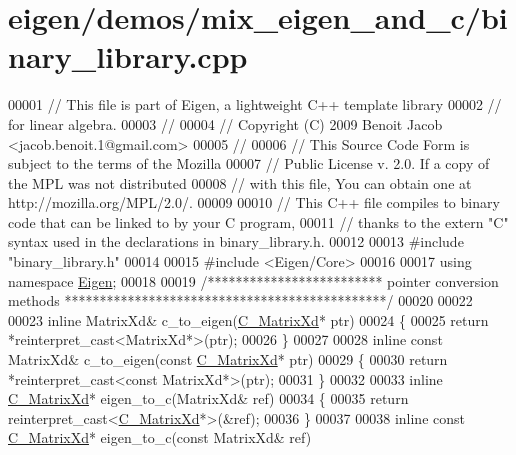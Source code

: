 \hypertarget{eigen_2demos_2mix__eigen__and__c_2binary__library_8cpp_source}{}\section{eigen/demos/mix\+\_\+eigen\+\_\+and\+\_\+c/binary\+\_\+library.cpp}
\label{eigen_2demos_2mix__eigen__and__c_2binary__library_8cpp_source}

\begin{DoxyCode}
00001 \textcolor{comment}{// This file is part of Eigen, a lightweight C++ template library}
00002 \textcolor{comment}{// for linear algebra.}
00003 \textcolor{comment}{//}
00004 \textcolor{comment}{// Copyright (C) 2009 Benoit Jacob <jacob.benoit.1@gmail.com>}
00005 \textcolor{comment}{//}
00006 \textcolor{comment}{// This Source Code Form is subject to the terms of the Mozilla}
00007 \textcolor{comment}{// Public License v. 2.0. If a copy of the MPL was not distributed}
00008 \textcolor{comment}{// with this file, You can obtain one at http://mozilla.org/MPL/2.0/.}
00009 
00010 \textcolor{comment}{// This C++ file compiles to binary code that can be linked to by your C program,}
00011 \textcolor{comment}{// thanks to the extern "C" syntax used in the declarations in binary\_library.h.}
00012 
00013 \textcolor{preprocessor}{#include "binary\_library.h"}
00014 
00015 \textcolor{preprocessor}{#include <Eigen/Core>}
00016 
00017 \textcolor{keyword}{using namespace }\hyperlink{namespace_eigen}{Eigen};
00018 
00019 \textcolor{comment}{/************************* pointer conversion methods **********************************************/}
00020 
00022 
00023 \textcolor{keyword}{inline} MatrixXd& c\_to\_eigen(\hyperlink{struct_c___matrix_xd}{C\_MatrixXd}* ptr)
00024 \{
00025   \textcolor{keywordflow}{return} *\textcolor{keyword}{reinterpret\_cast<}MatrixXd*\textcolor{keyword}{>}(ptr);
00026 \}
00027 
00028 \textcolor{keyword}{inline} \textcolor{keyword}{const} MatrixXd& c\_to\_eigen(\textcolor{keyword}{const} \hyperlink{struct_c___matrix_xd}{C\_MatrixXd}* ptr)
00029 \{
00030   \textcolor{keywordflow}{return} *\textcolor{keyword}{reinterpret\_cast<}\textcolor{keyword}{const }MatrixXd*\textcolor{keyword}{>}(ptr);
00031 \}
00032 
00033 \textcolor{keyword}{inline} \hyperlink{struct_c___matrix_xd}{C\_MatrixXd}* eigen\_to\_c(MatrixXd& ref)
00034 \{
00035   \textcolor{keywordflow}{return} \textcolor{keyword}{reinterpret\_cast<}\hyperlink{struct_c___matrix_xd}{C\_MatrixXd}*\textcolor{keyword}{>}(&ref);
00036 \}
00037 
00038 \textcolor{keyword}{inline} \textcolor{keyword}{const} \hyperlink{struct_c___matrix_xd}{C\_MatrixXd}* eigen\_to\_c(\textcolor{keyword}{const} MatrixXd& ref)

\end{DoxyCode}

